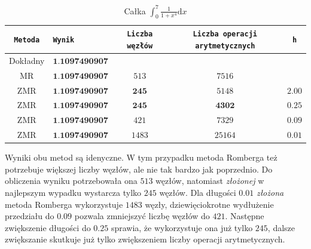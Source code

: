 \documentclass[11pt,leqno]{article}
\begin{document}
\begin{center}\begin{table}[ht]\begin{center}
    \caption{Całka $\int_{0}^{7}\frac{1}{1 + x^4}\mathrm{d}x$}
    \begin{tabular}{|c|l|c|c|c|} \hline
        \texttt{Metoda} & \texttt{Wynik}            & \texttt{Liczba węzłów} & \texttt{Liczba operacji arytmetycznych} & \texttt{h} \\ \hline
        Dokładny        & $\textbf{1.1097490907}$   &                        &                                         &            \\ \hline
        MR              & $\textbf{1.1097490907}$   & $513$                  & $7516$                                  &            \\ \hline
        ZMR             & $\textbf{1.1097490907}$   & $\textbf{245}$         & $5148$                                  & $2.00$     \\ \hline
        ZMR             & $\textbf{1.1097490907}$   & $\textbf{245}$         & $\textbf{4302}$                         & $0.25$     \\ \hline
        ZMR             & $\textbf{1.1097490907}$   & $421$                  & $7329$                                  & $0.09$     \\ \hline
        ZMR             & $\textbf{1.1097490907}$   & $1483$                 & $25164$                                 & $0.01$     \\ \hline
    \end{tabular}
\end{center}\end{table}\end{center}

Wyniki obu metod są idenyczne. W tym przypadku metoda Romberga też potrzebuje
większej liczby węzłów, ale nie tak bardzo jak poprzednio. Do obliczenia wyniku
potrzebowała ona $513$ węzłów, natomiast \textit{złożonej} w najlepszym wypadku
wystarcza tylko $245$ węzłów. Dla długości $0.01$ \textit{złożona} metoda
Romberga wykorzystuje $1483$ węzły, dziewięciokrotne wydłużenie przedziału do
$0.09$ pozwala zmniejszyć liczbę węzłów do $421$. Następne zwiększenie długości
do $0.25$ sprawia, że wykorzystuje ona już tylko $245$, dalsze zwiększanie
skutkuje już tylko zwiększeniem liczby operacji arytmetycznych.
\end{document}
